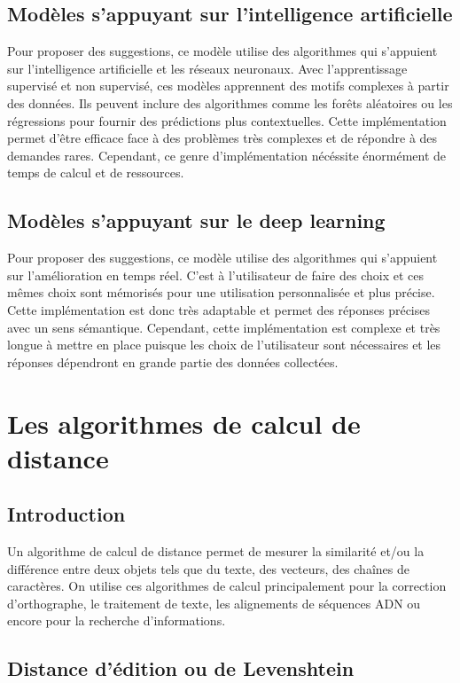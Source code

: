 \documentclass[a4paper, 11pt]{report}
\begin{document}
\section{Modèles s'appuyant sur l'intelligence artificielle}
Pour proposer des suggestions, ce modèle utilise des algorithmes qui s'appuient sur l'intelligence artificielle et les réseaux neuronaux.
Avec l’apprentissage supervisé et non supervisé, ces modèles apprennent des motifs complexes à partir des données. Ils peuvent inclure des algorithmes comme les forêts aléatoires ou les régressions pour fournir des prédictions plus contextuelles.
Cette implémentation permet d'être efficace face à des problèmes très complexes et de répondre à des demandes rares. Cependant, ce genre d'implémentation nécéssite énormément de temps de calcul et de ressources.


\section{Modèles s'appuyant sur le deep learning}
Pour proposer des suggestions, ce modèle utilise des algorithmes qui s'appuient sur l'amélioration en temps réel. C'est à l'utilisateur de faire des choix et ces mêmes choix sont mémorisés pour une utilisation personnalisée et plus précise. Cette implémentation est donc très adaptable et permet des réponses précises avec un sens sémantique. Cependant, cette implémentation est complexe et très longue à mettre en place puisque les choix de l'utilisateur sont nécessaires et les réponses dépendront en grande partie des données collectées.



\chapter{Les algorithmes de calcul de distance}

\section{Introduction}

Un algorithme de calcul de distance permet de mesurer la similarité et/ou la différence entre deux objets tels que du texte, des vecteurs, des chaînes de caractères. On utilise ces algorithmes de calcul principalement pour la correction d'orthographe, le traitement de texte, les alignements de séquences ADN ou encore pour la recherche d'informations.

\section{Distance d'édition ou de Levenshtein}\label{sec:levenshtein}
\end{document}
